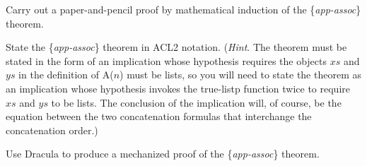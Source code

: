 \begin{comment}
\todo{Rex: I don't understand your hint below.  Is it necessary?}
\end{comment}
\begin{ExerciseList}
\Exercise Carry out a paper-and-pencil proof by mathematical induction of the \{\emph{app-assoc}\} theorem.

\Exercise State the \{\emph{app-assoc}\} theorem in ACL2 notation.
(\emph{Hint}. The theorem must be stated in the form of an implication whose hypothesis requires the objects $xs$ and $ys$ in the definition of A($n$) must be lists, so you will need to state the theorem as an implication whose hypothesis invokes the true-listp function twice to require $xs$ and $ys$ to be lists. The conclusion of the implication will, of course, be the equation between the two concatenation formulas that interchange the concatenation order.)

\Exercise Use Dracula to produce a mechanized proof of the \{\emph{app-assoc}\} theorem.
\end{ExerciseList}


